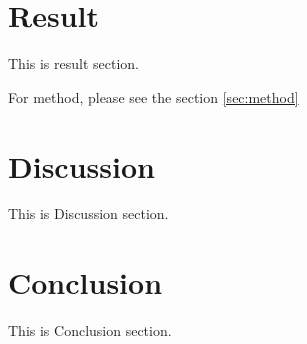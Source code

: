 \documentclass[titlepage]{article}
\begin{document}
\newpage
\section{Result}

This is result section.

For method, please see the section \ref{sec:method}

\newpage
\section{Discussion}

This is Discussion section.

\newpage
\section{Conclusion}

This is Conclusion section.
\end{document}
